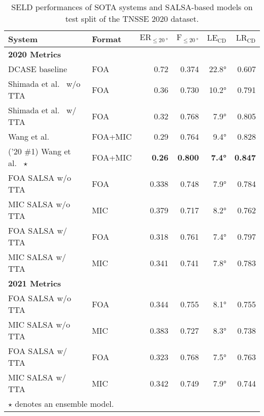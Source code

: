 \documentclass[journal]{IEEEtran}
\newcommand{\etalcite}[1]{ et al.~\cite{#1}}
\begin{document}
\begin{table}[t] 
    \setlength{\tabcolsep}{3pt}
    \centering
    \caption{SELD performances of SOTA systems and SALSA-based models on test split of the TNSSE 2020 dataset.}
    \noindent\begin{tabularx}{\columnwidth}{Xlrrrr}
    \toprule 
        System & Format &
        $\text{ER}_{\le \SI{20}{\degree}}$ &
        $\text{F}_{\le \SI{20}{\degree}}$ &
        $\text{LE}_\text{CD}$&
        $\text{LR}_\text{CD}$ \\
    \midrule
    \bfseries 2020 Metrics \\
        DCASE baseline~\cite{Politis2020ADetection}
            & FOA & 0.72\hphantom{0} & 0.374 & 22.8\si{\degree} & 0.607 \\
        Shimada\etalcite{Shimada2021ACCDOA:Detection} w/o TTA
            & FOA & 0.36\hphantom{0} & 0.730 & 10.2\si{\degree} & 0.791 \\
        Shimada\etalcite{Shimada2021ACCDOA:Detection} w/ TTA
            & FOA &0.32\hphantom{0} & 0.768 & 7.9\si{\degree} & 0.805 \\
        Wang\etalcite{Wang2020TheChallenge}
            & FOA+MIC & 0.29\hphantom{0} & 0.764 & 9.4\si{\degree} & 0.828 \\
        ('20 \#1) Wang\etalcite{Wang2020TheChallenge} $\star$ 
            & FOA+MIC & \bf{0.26\hphantom{0}} & \bf{0.800} & \bf{7.4\si{\degree}} & \bf{0.847} \\
    \midrule
        FOA SALSA w/o TTA
            & FOA & 0.338 & 0.748 & 7.9\si{\degree} & 0.784 \\
        MIC SALSA w/o TTA
            & MIC & 0.379 & 0.717 & 8.2\si{\degree} & 0.762 \\ 
        FOA SALSA w/ TTA
            & FOA & 0.318 & 0.761 & 7.4\si{\degree} & 0.797 \\
        MIC SALSA w/ TTA
            & MIC & 0.341 & 0.741 & 7.8\si{\degree} & 0.783 \\
    \midrule
    \midrule
    \bfseries 2021 Metrics \\
        FOA SALSA w/o TTA
            & FOA & 0.344 & 0.755 & 8.1\si{\degree} & 0.755 \\
        MIC SALSA w/o TTA
            & MIC & 0.383 & 0.727 & 8.3\si{\degree} & 0.738 \\ 
        FOA SALSA w/ TTA
            & FOA & 0.323 & 0.768 & 7.5\si{\degree} & 0.763 \\
        MIC SALSA w/ TTA
            & MIC & 0.342 & 0.749 & 7.9\si{\degree} & 0.744 \\
    \bottomrule
    \multicolumn{2}{l}{$\star$ denotes an ensemble model.}
    \end{tabularx}
    \label{tab:sota_2020_dev}
\end{table}
\end{document}

